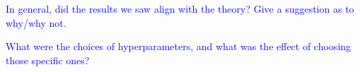 \textcolor{blue}{In general, did the results we saw align with the theory? Give a suggestion as to why/why not.}

\textcolor{blue}{What were the choices of hyperparameters, and what was the effect of choosing those specific ones?}